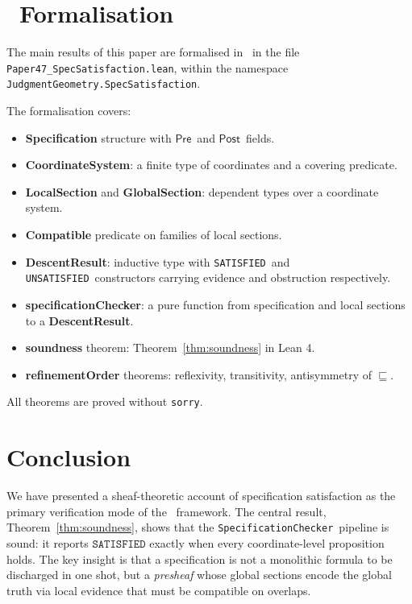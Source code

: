 \documentclass[11pt]{article}
\newcommand{\Pre}{\ensuremath{\mathsf{Pre}}}                     %
\newcommand{\Post}{\ensuremath{\mathsf{Post}}}                   %
\newcommand{\Refine}{\sqsubseteq}                   %
\newcommand{\SAT}{\texttt{SATISFIED}}               %
\newcommand{\UNSAT}{\texttt{UNSATISFIED}}           %
\newcommand{\SpecificationChecker}{\texttt{SpecificationChecker}}
\begin{document}
\section{\LEAN\ Formalisation}\label{sec:lean}

The main results of this paper are formalised in \LEAN\ in the file
\texttt{Paper47\_SpecSatisfaction.lean}, within the namespace\\
\texttt{JudgmentGeometry.SpecSatisfaction}.

The formalisation covers:
\begin{itemize}[leftmargin=2em]
  \item \textbf{Specification} structure with \Pre\ and \Post\ fields.
  \item \textbf{CoordinateSystem}: a finite type of coordinates and a
        covering predicate.
  \item \textbf{LocalSection} and \textbf{GlobalSection}: dependent
        types over a coordinate system.
  \item \textbf{Compatible} predicate on families of local sections.
  \item \textbf{DescentResult}: inductive type with \SAT\ and \UNSAT\
        constructors carrying evidence and obstruction respectively.
  \item \textbf{specificationChecker}: a pure function from
        specification and local sections to a \textbf{DescentResult}.
  \item \textbf{soundness} theorem: Theorem~\ref{thm:soundness} in
        Lean 4.
  \item \textbf{refinementOrder} theorems: reflexivity, transitivity,
        antisymmetry of $\Refine$.
\end{itemize}
All theorems are proved without \texttt{sorry}.

\section{Conclusion}\label{sec:conclusion}

We have presented a sheaf-theoretic account of specification
satisfaction as the primary verification mode of the \JuGeo\ framework.
The central result, Theorem~\ref{thm:soundness}, shows that the
\SpecificationChecker\ pipeline is sound: it reports $\SAT$ exactly
when every coordinate-level proposition holds.  The key insight is that
a specification is not a monolithic formula to be discharged in one
shot, but a \emph{presheaf} whose global sections encode the global
truth via local evidence that must be compatible on overlaps.
\end{document}
